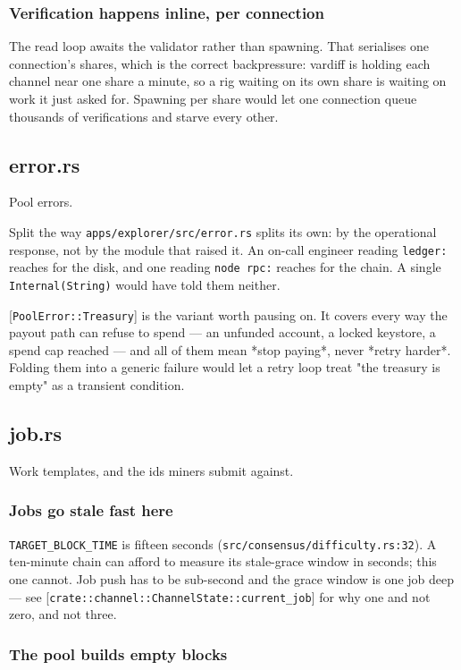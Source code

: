 \documentclass[11pt,a4paper]{article}
\begin{document}
\subsubsection{Verification happens inline, per connection}

The read loop awaits the validator rather than spawning. That serialises one
connection's shares, which is the correct backpressure: vardiff is holding
each channel near one share a minute, so a rig waiting on its own share is
waiting on work it just asked for. Spawning per share would let one
connection queue thousands of verifications and starve every other.

\subsection{error.rs}
Pool errors.

Split the way \texttt{apps/explorer/src/error.rs} splits its own: by the operational
response, not by the module that raised it. An on-call engineer reading
\texttt{ledger:} reaches for the disk, and one reading \texttt{node rpc:} reaches for the
chain. A single \texttt{Internal(String)} would have told them neither.

[\texttt{PoolError::Treasury}] is the variant worth pausing on. It covers every way
the payout path can refuse to spend — an unfunded account, a locked
keystore, a spend cap reached — and all of them mean *stop paying*, never
*retry harder*. Folding them into a generic failure would let a retry loop
treat "the treasury is empty" as a transient condition.

\subsection{job.rs}
Work templates, and the ids miners submit against.

\subsubsection{Jobs go stale fast here}

\texttt{TARGET\_BLOCK\_TIME} is fifteen seconds (\texttt{src/consensus/difficulty.rs:32}).
A ten-minute chain can afford to measure its stale-grace window in seconds;
this one cannot. Job push has to be sub-second and the grace window is one
job deep — see [\texttt{crate::channel::ChannelState::current\_job}] for why one and
not zero, and not three.

\subsubsection{The pool builds empty blocks}
\end{document}
